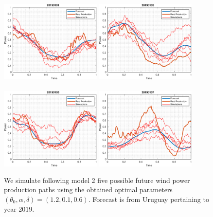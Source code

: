 \documentclass[11pt]{article}
\theoremstyle{definition}
\begin{document}
\begin{figure}[H]
\centering
\includegraphics[width=0.45\textwidth]{../../MATLAB_Files/Results/paths_testing_days/optimal_value/1.eps}
\includegraphics[width=0.45\textwidth]{../../MATLAB_Files/Results/paths_testing_days/optimal_value/2.eps}\\
\quad\\
\includegraphics[width=0.45\textwidth]{../../MATLAB_Files/Results/paths_testing_days/optimal_value/3.eps}
\includegraphics[width=0.45\textwidth]{../../MATLAB_Files/Results/paths_testing_days/optimal_value/4.eps}
\caption{We simulate following model 2  five possible future wind power production paths using the obtained optimal parameters $(\theta_0, \alpha ,\delta)=(1.2,0.1,0.6)$. Forecast is from Uruguay pertaining to  year 2019.}
\end{figure}
\end{document}
